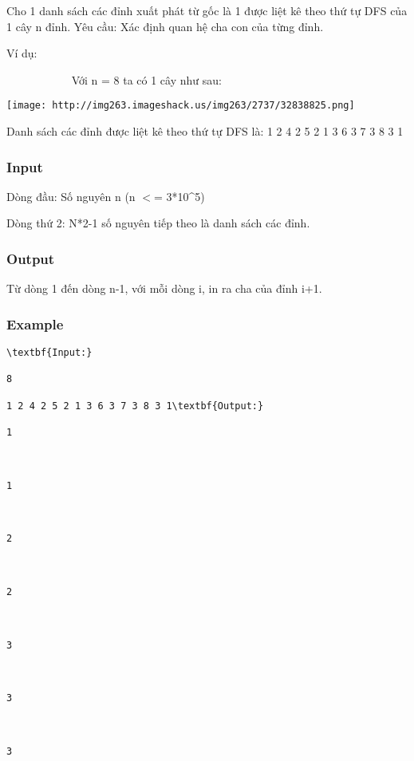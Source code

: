

Cho 1 danh sách các đỉnh xuất phát từ gốc là 1 được liệt kê theo thứ tự DFS của 1 cây n đỉnh. Yêu cầu: Xác định quan hệ cha con của từng đỉnh.

Ví dụ:

            Với n = 8 ta có 1 cây như sau:


\texttt{[image: http://img263.imageshack.us/img263/2737/32838825.png]}

Danh sách các đỉnh được liệt kê theo thứ tự DFS là: 1 2 4 2 5 2 1 3 6 3 7 3 8 3 1

\subsubsection{Input}

Dòng đầu: Số nguyên n (n $<$= 3*10\textasciicircum5)

Dòng thứ 2: N*2-1 số nguyên tiếp theo là danh sách các đỉnh.

\subsubsection{Output}

Từ dòng 1 đến dòng n-1, với mỗi dòng i, in ra cha của đỉnh i+1.

\subsubsection{Example}
\begin{verbatim}
\textbf{Input:}

8

1 2 4 2 5 2 1 3 6 3 7 3 8 3 1\textbf{Output:}

1



1



2



2



3



3



3

\end{verbatim}